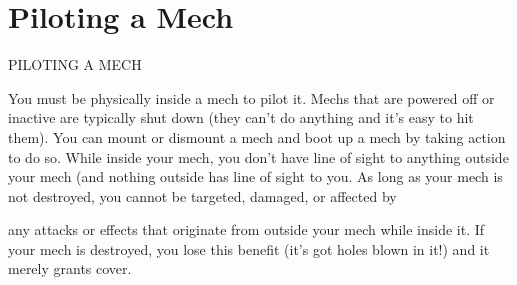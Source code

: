 \section{Piloting a Mech}
                                          PILOTING A MECH

You must be physically inside a mech to pilot it. Mechs that are powered off or inactive are
typically shut down (they can’t do anything and it’s easy to hit them). You can mount or
dismount a mech and boot up a mech by taking action to do so. While inside your mech, you
don’t have line of sight to anything outside your mech (and nothing outside has line of sight to
you. As long as your mech is not destroyed, you cannot be targeted, damaged, or affected by




any attacks or effects that originate from outside your mech while inside it. If your mech is
destroyed, you lose this benefit (it’s got holes blown in it!) and it merely grants cover.
